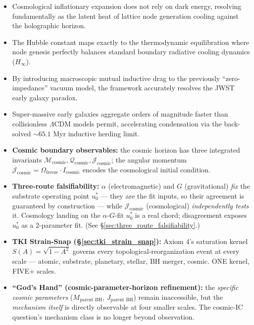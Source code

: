 \begin{summarybox}
\begin{itemize}
    \item Cosmological inflationary expansion does not rely on dark energy, resolving fundamentally as the latent heat of lattice node generation cooling against the holographic horizon.
    \item The Hubble constant maps exactly to the thermodynamic equilibration where node genesis perfectly balances standard boundary radiative cooling dynamics ($H_\infty$).
    \item By introducing macroscopic mutual inductive drag to the previously ``zero-impedance'' vacuum model, the framework accurately resolves the JWST early galaxy paradox.
    \item Super-massive early galaxies aggregate orders of magnitude faster than collisionless $\Lambda$CDM models permit, accelerating condensation via the back-solved $\sim 65.1$ Myr inductive herding limit.
    \item \textbf{Cosmic boundary observables:} the cosmic horizon has three integrated invariants $\mathcal{M}_{\text{cosmic}}, \mathcal{Q}_{\text{cosmic}}, \mathcal{J}_{\text{cosmic}}$; the angular momentum $\mathcal{J}_{\text{cosmic}} = \Omega_{\text{freeze}} \cdot I_{\text{cosmic}}$ encodes the cosmological initial condition.
    \item \textbf{Three-route falsifiability:} $\alpha$ (electromagnetic) and $G$ (gravitational) \emph{fix} the substrate operating point $u_0^*$ --- they are the fit inputs, so their agreement is guaranteed by construction --- while $\mathcal{J}_{\text{cosmic}}$ (cosmological) \emph{independently tests} it. Cosmology landing on the $\alpha$-$G$-fit $u_0^*$ is a real chord; disagreement exposes $u_0^*$ as a 2-parameter fit. (See \S\ref{sec:three_route_falsifiability}.)
    \item \textbf{TKI Strain-Snap (\S\ref{sec:tki_strain_snap}):} Axiom 4's saturation kernel $S(A) = \sqrt{1-A^2}$ governs every topological-reorganization event at every scale --- atomic, substrate, planetary, stellar, BH merger, cosmic. ONE kernel, FIVE+ scales.
    \item \textbf{``God's Hand'' (cosmic-parameter-horizon refinement):} the \emph{specific cosmic parameters} ($M_{\text{parent BH}}$, $J_{\text{parent BH}}$) remain inaccessible, but the \emph{mechanism itself} is directly observable at four smaller scales. The cosmic-IC question's mechanism class is no longer beyond observation.
\end{itemize}
\end{summarybox}

